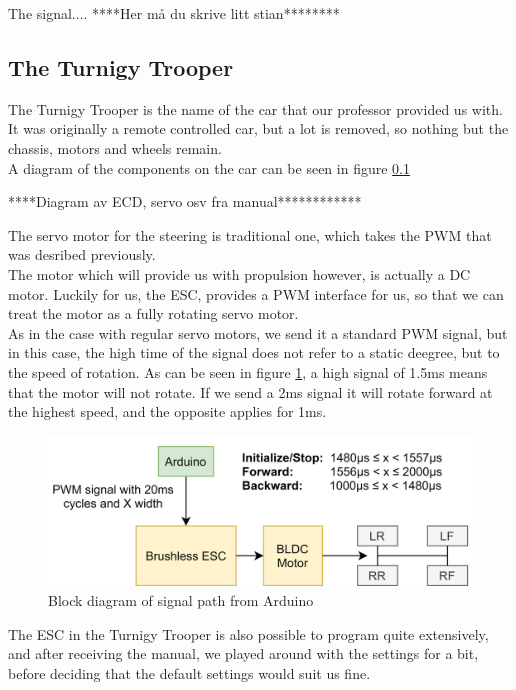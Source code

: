 \documentclass{article}
\begin{document}
The signal.... ****Her må du skrive litt stian********




\subsection{The Turnigy Trooper}
The Turnigy Trooper is the name of the car that our professor provided us with. It was originally a remote controlled car, but a lot is removed, so nothing but the chassis, motors and wheels remain.\\ 

A diagram of the components on the car can be seen in figure \ref{}

****Diagram av ECD, servo osv fra manual************


The servo motor for the steering is traditional one, which takes the PWM that was desribed previously.\\ 

The motor which will provide us with propulsion however, is actually a DC motor. Luckily for us, the ESC, provides a PWM interface for us, so that we can treat the motor as a fully rotating servo motor.\\ 

As in the case with regular servo motors, we send it a standard PWM signal, but in this case, the high time of the signal does not refer to a static deegree, but to the speed of rotation. As can be seen in figure \ref{esc}, a high signal of 1.5ms means that the motor will not rotate. If we send a 2ms signal it will rotate forward at the highest speed, and the opposite applies for 1ms. 

\begin{figure}[H]
	\centering
	\includegraphics[width=\linewidth]{brushless-motor-esc.png}
	\caption{Block diagram of signal path from Arduino}
	\label{esc}
\end{figure}


The ESC in the Turnigy Trooper is also possible to program quite extensively, and after receiving the manual, we played around with the settings for a bit, before deciding that the default settings would suit us fine. 
\end{document}
